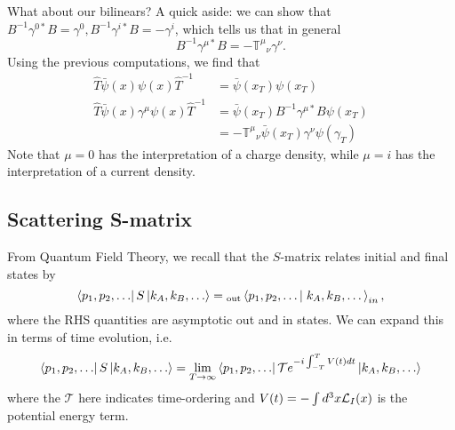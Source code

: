 What about our bilinears? 
A quick aside: we can show that $B^{-1} \gamma^{0*} B= \gamma^0, B^{-1}\gamma^{i*} B = -\gamma^i$, which tells us that in general 
\begin{equation}
    B^{-1}\gamma^{\mu *} B = -\mathbb{T}^\mu{}_\nu \gamma^\nu.
\end{equation}
Using the previous computations, we find that
\begin{align*}
    \hat T \bar \psi(x) \psi(x) \hat T^{-1} &= \bar \psi(x_T) \psi (x_T)\\
    \hat T \bar \psi(x) \gamma^\mu \psi(x) \hat T^{-1} &= \bar \psi(x_T) B^{-1} \gamma^{\mu*} B \psi (x_T)\\
        &= -\mathbb{T}^\mu{}_\nu \bar \psi(x_T) \gamma^\nu \psi(\gamma_T)
\end{align*}
Note that $\mu=0$ has the interpretation of a charge density, while $\mu=i$ has the interpretation of a current density.

\subsection*{Scattering S-matrix}
From Quantum Field Theory, we recall that the $S$-matrix relates initial and final states by
\begin{equation*}
    \bra{p_1,p_2,\ldots}S \ket{k_A,k_B,\ldots}={}_\text{out}\braket{p_1,p_2,\ldots}{k_A,k_B,\ldots}_{in},
\end{equation*}
where the RHS quantities are asymptotic out and in states. We can expand this in terms of time evolution, i.e.
\begin{equation*}
    \left< p_1,p_2,\ldots \right|S \left| k_A,k_B,\ldots \right> = \lim_{T\to\infty} \left< p_1,p_2,\ldots \right| \mathcal{T} e^{-i\int_{-T}^T V(t)dt} \left| k_A,k_B,\ldots \right>
\end{equation*}
where the $\mathcal{T}$ here indicates time-ordering and $V(t)=-\int d^3x \mathcal L_I (x)$ is the potential energy term.


